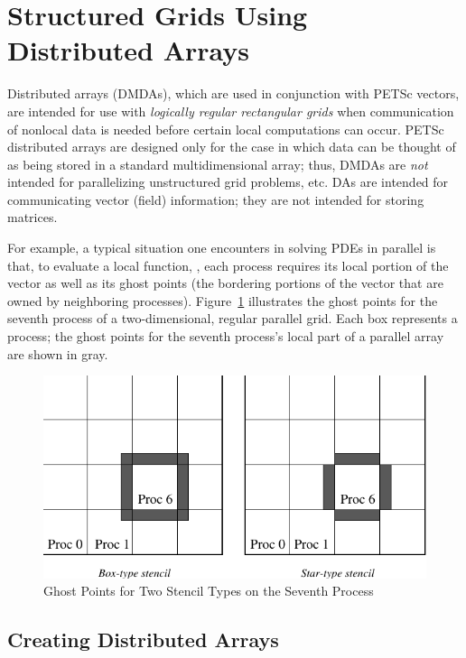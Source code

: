\section{Structured Grids Using Distributed Arrays}
\label{sec_da} \label{sec_struct}

  Distributed arrays (DMDAs), which are used in
conjunction with PETSc vectors, are intended for use with {\em
logically regular rectangular grids} when communication of nonlocal data is
needed before certain local computations can occur.  PETSc distributed
arrays are designed only for the case in which data can be thought of
as being stored in a standard multidimensional array; thus, DMDAs
are {\em not} intended for parallelizing unstructured grid problems, etc.
DAs are intended for communicating vector (field) information; they
are not intended for storing matrices.

For example, a typical situation one encounters in solving
PDEs in parallel is that, to evaluate a local function, , each process
requires its local portion of the vector  as well as its ghost
points  (the bordering portions of the vector
that are owned by neighboring processes).  Figure~\ref{fig_ghosts}
illustrates the ghost points for the seventh process of a
two-dimensional, regular parallel grid.  Each box represents a
process; the ghost points for the seventh process's local part of
a parallel array are shown in gray.

\begin{figure}[tb]
\centerline{ \includegraphics{ghost}}
\caption{Ghost Points for Two Stencil Types on the Seventh Process}
\label{fig_ghosts}
\end{figure}

\subsection{Creating Distributed Arrays}

